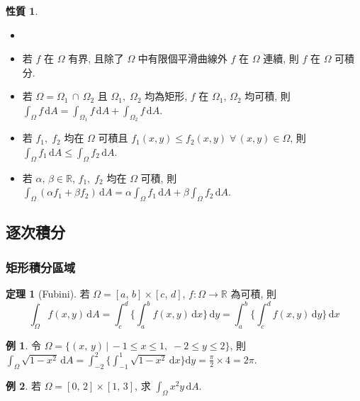 \documentclass[12pt]{extarticle}
\newcommand{\ds}{\displaystyle}
\theoremstyle{definition}
\newtheorem*{prp}{性質}
\newtheorem*{thm}{定理}
\newtheorem*{ex}{例}
\begin{document}
\begin{prp}
  \begin{itemize}\setlength{\itemsep}{0pt}
    \item[]
    \item 若 $f$ 在 $\Omega$ 有界, 且除了 $\Omega$ 中有限個平滑曲線外 $f$ 在 $\Omega$ 連續, 則 $f$ 在 $\Omega$ 可積分. 
    \item 若 $\Omega = \Omega_1\,\cap\,\Omega_2$ 且 $\Omega_1,\;\Omega_2$ 均為矩形, $f$ 在 $\Omega_1$, $\Omega_2$ 均可積, 則 $\ds\int_\Omega f\,\text{d}A = \int_{\Omega_1}f\,\text{d}A + \int_{\Omega_2}f\,\text{d}A$.
    \item 若 $f_1,\;f_2$ 均在 $\Omega$ 可積且 $f_1(x, y)\leqslant f_2(x, y)\;\forall\,(x,y)\in\Omega$, 則 $\ds\int_\Omega f_1\,\text{d}A \leqslant\int_\Omega f_2\,\text{d}A$.
    \item 若 $\alpha,\,\beta\in\mathbb{R}$, $f_1,\;f_2$ 均在 $\Omega$ 可積, 則 $\ds\int_\Omega(\alpha f_1 + \beta f_2)\,\text{d}A = \alpha\!\int_\Omega f_1\,\text{d}A + \beta\!\int_\Omega f_2\,\text{d}A$.
  \end{itemize}
\end{prp}

\subsection*{逐次積分}

\subsubsection*{矩形積分區域}

\begin{thm}[Fubini]
  若 $\Omega = [a,\,b]\times[c,\,d]$, $f:\Omega\to\mathbb{R}$ 為可積, 則 $$\int_\Omega f(x, y)\,\text{d}A = \int_c^d\!\bigg\{\!\int_a^b f(x, y)\,\text{d}x\bigg\}\,\text{d}y = \int_a^b\!\bigg\{\!\int_c^d f(x, y)\,\text{d}y\bigg\}\,\text{d}x$$
\end{thm}

\begin{ex}
  令 $\Omega = \{(x,\,y)\,|\,-1\leqslant x\leqslant 1,\;-2\leqslant y\leqslant 2\}$, 則 $\ds\int_\Omega\sqrt{1 - x^2}\,\text{d}A = \ds\int_{-2}^2\bigg\{\!\int_{-1}^1 \sqrt{1 - x^2}\,\text{d}x\bigg\}\text{d}y = \frac{\pi}{2}\times 4 = 2\pi$.
\end{ex}

\begin{ex}
  若 $\Omega = [0,\,2]\times[1,\,3]$, 求 $\ds\int_\Omega x^2y\,\text{d}A$.
\end{ex}
\end{document}
